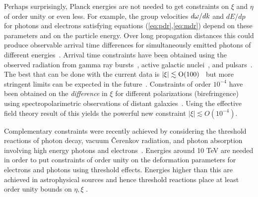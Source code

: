 \documentclass[12pt]{article}
\begin{document}
Perhaps surprisingly, Planck energies are not needed to get
constraints on $\xi$ and $\eta$ of order unity or even less. For
example, the group velocities $d\omega/dk$ and $dE/dp$ for photons
and electrons satisfying equations (\ref{eq:pdr},\ref{eq:mdr})
depend on these parameters and on the particle energy.
%
%
Over long propagation distances this could produce observable
arrival time differences for simultaneously emitted photons of
different energies~\cite{Pav,Amelino-Camelia:1997gz}. Arrival
time constraints have been obtained using the observed radiation
from gamma ray bursts~\cite{schaefer}, active galactic
nuclei~\cite{Biller}, and pulsars~\cite{Kaaret:1999ve}. The best
that can be done with the current data is $|\xi|\lesssim {\rm
O}(100)$~\cite{schaefer,Biller} but more stringent limits can be
expected in the future~\cite{Norris:1999nh}. Constraints of order
$10^{-4}$ have been obtained on the {\it difference} in $\xi$ for
different polarizations (birefringence) using spectropolarimetric
observations of distant galaxies~\cite{GK}. Using the effective
field theory result of \cite{MP} this yields the powerful new
constraint $|\xi|\lesssim O(10^{-4})$.

Complementary constraints were recently achieved by considering
the threshold reactions of photon decay, vacuum \v{C}erenkov
radiation, and photon absorption involving high energy photons
and electrons~\cite{CG,Gonzalez-Mestres:1995jg,Stecker:2001vb,
Jacobson:2001tu,JLM02,Konopka:2002tt,Amelino-Camelia:2002dx,Jacobson:2003ty}.
Energies around 10 TeV are needed in order to put constraints of
order unity on the deformation parameters for electrons and
photons using threshold effects. Energies higher than this are
achieved in astrophysical sources and hence threshold reactions
place at least order unity bounds on $\eta,\xi$ .
\end{document}
